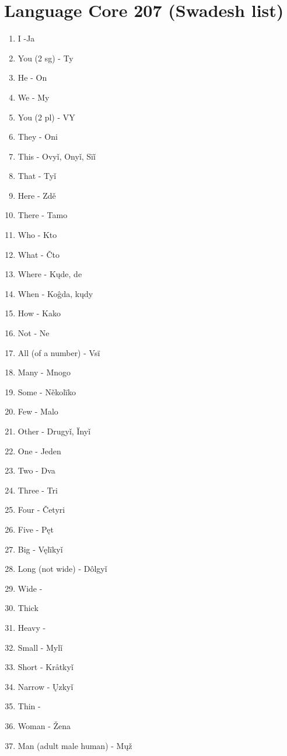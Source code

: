 \section{Language Core 207 (Swadesh list)}

\begin{multicols}{2}
\begin{enumerate}
	\item I -Ja
	\item You (2 sg) - Ty
	\item He - On
	\item We - My
	\item You (2 pl) - VY
	\item They - Oni
	\item This - Ovyǐ, Onyǐ, Sïǐ
	\item That - Tyǐ
	\item Here - Zdě
	\item There - Tamo
	\item Who - Kto
	\item What - Čto
	\item Where - Kųde, de
	\item When - Koĝda, kųdy
	\item How - Kako
	\item Not - Ne
	\item All (of a number) - Vsï
	\item Many - Mnogo
	\item Some - Několïko
	\item Few - Malo
	\item Other - Drugyǐ, Ïnyǐ
	\item One - Jeden
	\item Two - Dva
	\item Three - Tri
	\item Four - Četyri
	\item Five - Pęt
	\item Big - Vęlïkyǐ
	\item Long (not wide) - Dôlgyǐ
	\item Wide - 
	\item Thick
	\item Heavy - 
	\item Small - Mylǐ
	\item Short - Kråtkyǐ
	\item Narrow - Ųzkyǐ
	\item Thin - 
	\item Woman - Žena
	\item Man (adult male human) - Mųž

\end{enumerate}
\end{multicols}
